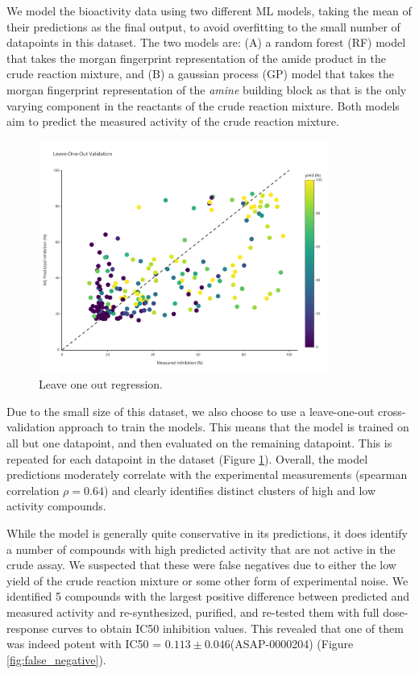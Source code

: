 We model the bioactivity data using two different ML models, taking the mean of their predictions as the final output, to avoid overfitting to the small number of datapoints in this dataset. The two models are: (A) a random forest (RF) model that takes the morgan fingerprint representation of the amide product in the crude reaction mixture, and (B) a gaussian process (GP) model that takes the morgan fingerprint representation of the \textit{amine} building block as that is the only varying component in the reactants of the crude reaction mixture. Both models aim to predict the measured activity of the crude reaction mixture.

\begin{figure}[!t]
    \centering
    \includegraphics[width=0.85\textwidth]{Chapters/Crude/Figs/rf_loo.pdf}
    \caption{Leave one out regression.}
    \label{fig:leave-one-out}
\end{figure}


Due to the small size of this dataset, we also choose to use a leave-one-out cross-validation approach to train the models. This means that the model is trained on all but one datapoint, and then evaluated on the remaining datapoint. This is repeated for each datapoint in the dataset (Figure \ref{fig:leave-one-out}). Overall, the model predictions moderately correlate with the experimental measurements (spearman correlation $\rho =0.64$) and clearly identifies distinct clusters of high and low activity compounds. 

While the model is generally quite conservative in its predictions, it does identify a number of compounds with high predicted activity that are not active in the crude assay. We suspected that these were false negatives due to either the low yield of the crude reaction mixture or some other form of experimental noise. We identified 5 compounds with the largest positive difference between predicted and measured activity and re-synthesized, purified, and re-tested them with full dose-response curves to obtain IC50 inhibition values. This revealed that one of them was indeed potent with IC50 = $0.113\pm0.046$\uM (ASAP-0000204) (Figure \ref{fig:false_negative}).

